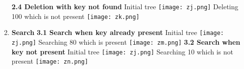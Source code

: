 \documentclass[12pt]{article}
\begin{document}
\begin{enumerate}
        \textbf{2.4 Deletion with key not found}\newline
        Initial tree \newline \newline
            \texttt{[image: zj.png]}\newline
        Deleting 100 which is not present\newline\newline
            \texttt{[image: zk.png]}\newline
        \newpage
        
        \item \textbf{Search}\newline
        \textbf{3.1 Search when key already present} \newline
        Initial tree \newline \newline
             \texttt{[image: zj.png]}\newline
        Searching 80 which is present \newline\newline
            \texttt{[image: zm.png]}\newline
        \newpage
        \textbf{3.2 Search when key not present} \newline
        Initial tree\newline \newline
             \texttt{[image: zj.png]}\newline
        Searching 10 which is not present \newline\newline
            \texttt{[image: zn.png]}\newline
        \newpage
    \end{enumerate}
\end{document}
